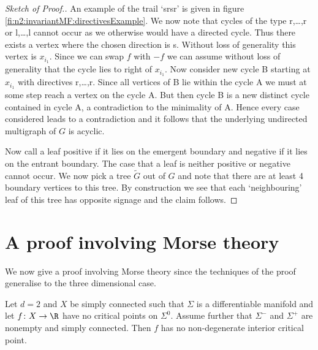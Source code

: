 \begin{proof}[Sketch of Proof.]
  An example of the trail `srsr' is given in figure \ref{fi:n2:invariantMF:directivesExample}.
  We now note that cycles of the type r,\dots,r or l,\dots,l
  cannot occur as we otherwise would have a directed cycle. Thus there exists a vertex where the chosen direction is s. 
  Without loss of generality this vertex is $x_{i_1}$.
  Since we can swap $f$ with $-f$ we can assume without loss of generality that the cycle lies to right of $x_{i_1}$.
  Now consider new cycle B starting at $x_{i_1}$ with directives r,\dots,r.
  Since all vertices of B lie within the cycle A we must at some step reach a vertex on the cycle A. But then cycle B is a new distinct cycle
  contained in cycle A, a contradiction to the minimality of A.
  Hence every case considered leads to a contradiction and it follows that the underlying undirected multigraph of $G$
  is acyclic.
  
  Now call a leaf positive if it lies on the emergent boundary and
  negative if it lies on the entrant boundary. The case that a leaf is neither positive or negative cannot occur.
  We now pick a tree $\widetilde{G}$ out of $G$ and note that
  there are at least 4 boundary vertices to this tree.
  By construction we see that each `neighbouring' leaf of this tree
  has opposite signage and the claim follows.
\end{proof}

\section{A proof involving Morse theory}


We now give a proof involving Morse theory since the techniques of the proof generalise to the three dimensional case.
\begin{proposition}
  Let $d=2$ and $X$ be simply connected such that $\Sigma$ is a differentiable manifold and let $f\colon X\to\R$ have no critical points on $\Sigma^0$.
  Assume further that $\Sigma^-$ and $\Sigma^+$ are nonempty and simply connected. Then $f$ has no non-degenerate interior critical point.
\end{proposition}

